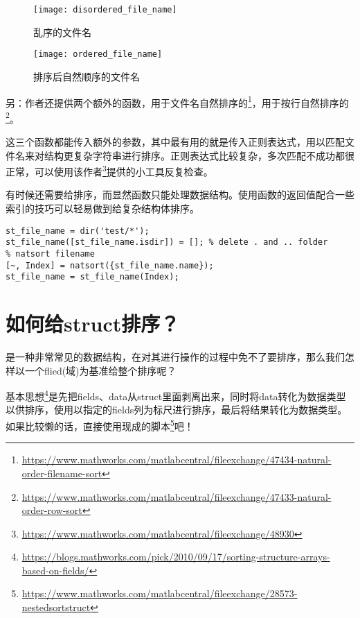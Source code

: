 \begin{figure}[h]
    \centering
    \begin{minipage}{0.45\textwidth}
        \centering
        \texttt{[image: disordered\_file\_name]}
        \caption{乱序的文件名}
    \end{minipage}
    \begin{minipage}{0.45\textwidth}
        \centering
        \texttt{[image: ordered\_file\_name]}
        \caption{排序后自然顺序的文件名}
    \end{minipage}
\end{figure}

另：作者还提供两个额外的函数，用于文件名自然排序的\footnote{\url{https://www.mathworks.com/matlabcentral/fileexchange/47434-natural-order-filename-sort}}，用于按行自然排序的\footnote{\url{https://www.mathworks.com/matlabcentral/fileexchange/47433-natural-order-row-sort}}。

这三个函数都能传入额外的参数，其中最有用的就是传入正则表达式，用以匹配文件名来对结构更复杂字符串进行排序。正则表达式比较复杂，多次匹配不成功都很正常，可以使用该作者\footnote{\url{https://www.mathworks.com/matlabcentral/fileexchange/48930}}提供的小工具反复检查。

有时候还需要给排序，而显然函数只能处理数据结构。使用函数的返回值配合一些索引的技巧可以轻易做到给复杂结构体排序。

\begin{verbatim}
st_file_name = dir('test/*');
st_file_name([st_file_name.isdir]) = []; % delete . and .. folder
% natsort filename
[~, Index] = natsort({st_file_name.name});
st_file_name = st_file_name(Index);
\end{verbatim}

\section{如何给struct排序？}

是一种非常常见的数据结构，在对其进行操作的过程中免不了要排序，那么我们怎样以一个flied(域)为基准给整个排序呢？

基本思想\footnote{\url{https://blogs.mathworks.com/pick/2010/09/17/sorting-structure-arrays-based-on-fields/}}是先把fields、data从struct里面剥离出来，同时将data转化为数据类型以供排序，使用以指定的fields列为标尺进行排序，最后将结果转化为数据类型。如果比较懒的话，直接使用现成的脚本\footnote{\url{https://www.mathworks.com/matlabcentral/fileexchange/28573-nestedsortstruct}}吧！

